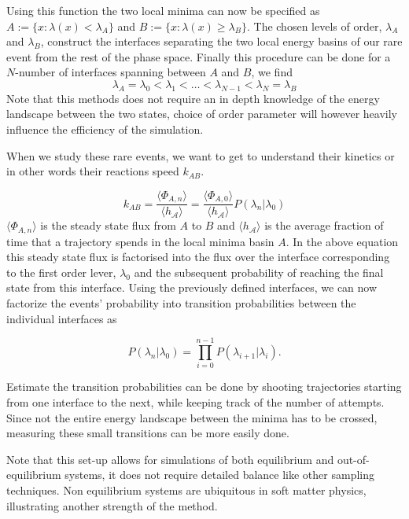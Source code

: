 Using this function the two local minima can
now be specified as $A := \{x: \lambda(x) < \lambda_A\} $ and $B := \{x: \lambda(x) \geq
\lambda_B\} $. The chosen levels of order, $\lambda_A$ and $\lambda_B$, construct the
interfaces separating the two local energy basins of our rare event from the rest of the
phase space. Finally this procedure can be done for a $N$-number of interfaces spanning
between $A$ and  $B$, we find
\begin{equation}
\lambda_A = \lambda_0 < \lambda_1< \dots < \lambda_{N-1} < \lambda_N = \lambda_B
\end{equation}
Note that this methods does not require an in depth knowledge of the energy landscape
between the two states, choice of order parameter will however heavily influence the
efficiency of the simulation.

When we study these rare events, we want to get to understand their kinetics or in other
words their reactions speed $k_{AB}$.

 \begin{equation}
    k_{AB} = \frac{\langle \Phi_{A,n} \rangle}{\langle h_{\mathcal{A}}\rangle} =
    \frac{\langle \Phi_{A,0} \rangle}{\langle h_{\mathcal{A}}\rangle}
    P(\lambda_n|\lambda_0)
 \end{equation}
 $\langle \Phi_{A,n} \rangle$ is the steady state flux from $A$ to  $B$ and
$\langle h_{\mathcal{A}}\rangle$ is the average fraction of time that  a trajectory
spends in the local minima basin $A$. In the above equation this steady state flux is
factorised into the flux over the interface corresponding to the first order lever,
$\lambda_0$ and the subsequent probability of reaching the final state from this
interface. Using the previously defined interfaces, we can now factorize the events'
probability into transition probabilities between the individual interfaces as

\begin{equation}
    P(\lambda_n|\lambda_0) = \prod_{i=0}^{n-1} P(\lambda_{i+1}|\lambda_i).
 \end{equation}

Estimate the transition probabilities can be done by shooting trajectories starting from
one interface to the next, while keeping track of the number of attempts. Since not the
entire energy landscape between the minima has to be crossed, measuring these small
transitions can be more easily done.


Note that this set-up allows for simulations of both equilibrium and out-of-equilibrium
systems, it does not require detailed balance like other sampling techniques.  Non
equilibrium systems are ubiquitous in soft matter physics, illustrating another strength
of the method.

